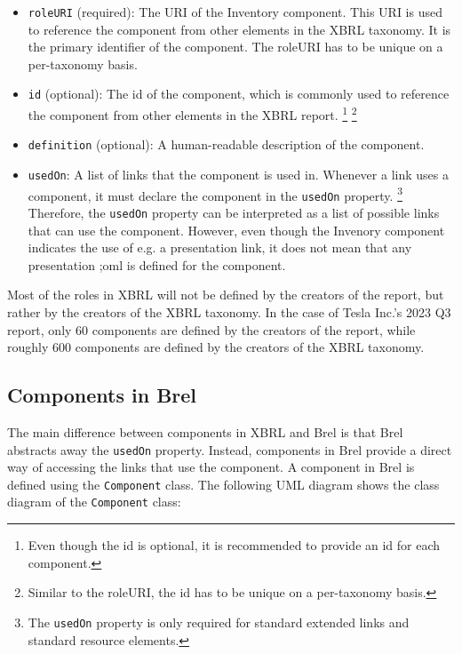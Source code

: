 \begin{itemize}
  \item \texttt{roleURI} (required): The URI of the Inventory component. This URI is used to reference the component from other elements in the XBRL taxonomy. It is the primary identifier of the component. 
  The roleURI has to be unique on a per-taxonomy basis.\cite{xbrl21_custom_roles}
  \item \texttt{id} (optional): The id of the component, which is commonly used to reference the component from other elements in the XBRL report.
  \footnote[3]{Even though the id is optional, it is recommended to provide an id for each component.\cite{xbrl21_custom_roles}}
  \footnote[4]{Similar to the roleURI, the id has to be unique on a per-taxonomy basis.\cite{xml_id}}
  \item \texttt{definition} (optional): A human-readable description of the component. 
  \item \texttt{usedOn}: A list of links that the component is used in. 
  Whenever a link uses a component, it must declare the component in the \texttt{usedOn} property.
  \footnote[5]{The \texttt{usedOn} property is only required for standard extended links and standard resource elements.\cite{xbrl21_custom_roles}}
  Therefore, the \texttt{usedOn} property can be interpreted as a list of possible links that can use the component.
  However, even though the Invenory component indicates the use of e.g. a presentation link, it does not mean that any presentation ;oml is defined for the component.
\end{itemize}

Most of the roles in XBRL will not be defined by the creators of the report, but rather by the creators of the XBRL taxonomy. 
In the case of Tesla Inc.'s 2023 Q3 report, only 60 components are defined by the creators of the report, while roughly 600 components are defined by the creators of the XBRL taxonomy.\cite{tesla_10q_2023_q3}

\subsection{Components in Brel}

The main difference between components in XBRL and Brel is that Brel abstracts away the \texttt{usedOn} property. 
Instead, components in Brel provide a direct way of accessing the links that use the component. 
A component in Brel is defined using the \texttt{Component} class. 
The following UML diagram shows the class diagram of the \texttt{Component} class:

